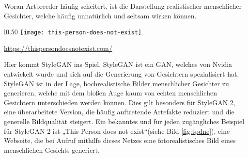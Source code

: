     
\noindent  Woran Artbreeder häufig scheitert, ist die Darstellung realistischer menschlicher Gesichter, welche häufig unnatürlich und seltsam wirken können.

\begin{wrapfigure}[18]{l}{0.50\textwidth}
    \centering
    \texttt{[image: this-person-does-not-exist]}
    \caption{KI-genertiertes Gesicht} \quelle\url{https://thispersondoesnotexist.com/}
    \label{fig:tpdne}
    \end{wrapfigure}

\hfill
\break
Hier kommt StyleGAN ins Spiel. StyleGAN ist ein GAN, welches von Nvidia entwickelt wurde und sich auf die Generierung von Gesichtern spezialisiert hat. StyleGAN ist in der Lage, hochrealistische Bilder menschlicher Gesichter zu generieren, welche mit dem bloßen Auge kaum von echten menschlichen Gesichtern unterschieden werden können. Dies gilt besonders für StyleGAN 2, eine überarbeitete Version, die häufig auftretende Artefakte reduziert und die generelle Bildqualität steigert. Ein bekanntes und für jeden zugängliches Beispiel für StyleGAN 2 ist „This Person does not exist“(siehe Bild \ref{fig:tpdne}), eine Webseite, die bei Aufruf mithilfe dieses Netzes eine fotorealistisches Bild eines menschlichen Gesichts generiert.

\newpage
